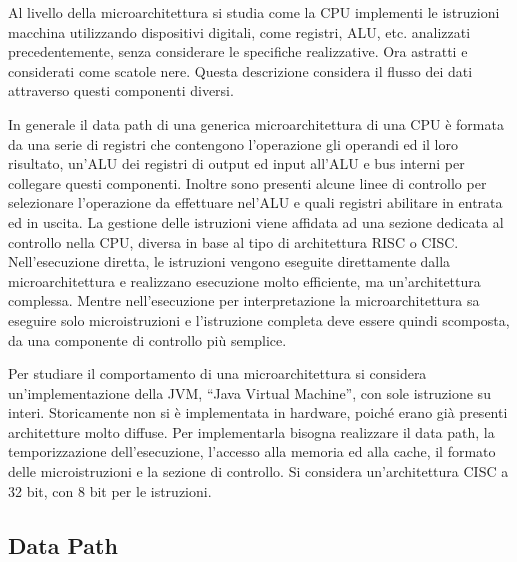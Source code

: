 \documentclass{article}
\numberwithin{equation}{subsection}
\begin{document}
Al livello della microarchitettura si studia come la CPU implementi le istruzioni macchina utilizzando dispositivi digitali, come registri, ALU, etc. analizzati precedentemente, senza 
considerare le specifiche realizzative. Ora astratti e considerati come scatole nere. Questa descrizione considera il flusso dei dati attraverso questi componenti diversi. 

In generale il data path di una generica microarchitettura di una CPU è formata da una serie di registri che contengono l'operazione gli operandi ed il loro risultato, un'ALU dei registri 
di output ed input all'ALU e bus interni per collegare questi componenti. Inoltre sono presenti alcune linee di controllo per selezionare l'operazione da effettuare nel'ALU e quali registri 
abilitare in entrata ed in uscita. 
La gestione delle istruzioni viene affidata ad una sezione dedicata al controllo nella CPU, diversa in base al tipo di architettura RISC o CISC. 
Nell'esecuzione diretta, le istruzioni vengono eseguite direttamente dalla microarchitettura e realizzano esecuzione molto efficiente, ma un'architettura complessa. Mentre nell'esecuzione 
per interpretazione la microarchitettura sa eseguire solo microistruzioni e l'istruzione completa deve essere quindi scomposta, da una componente di controllo più semplice. 


Per studiare il comportamento di una microarchitettura si considera un'implementazione della JVM, ``Java Virtual Machine'', con sole istruzione su interi. Storicamente non si è implementata 
in hardware, poiché erano già presenti architetture molto diffuse. Per implementarla bisogna realizzare il data path, la temporizzazione dell'esecuzione, l'accesso alla memoria ed alla cache, 
il formato delle microistruzioni e la sezione di controllo. Si considera un'architettura CISC a 32 bit, con 8 bit per le istruzioni. 

\subsection{Data Path}
\label{sec:data-path}
\end{document}
